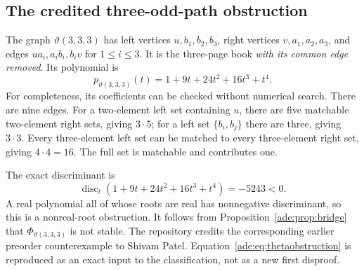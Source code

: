 \documentclass[11pt]{article}
\numberwithin{equation}{section}
\theoremstyle{definition}
\newcommand{\disc}{\operatorname{disc}}
\begin{document}
\subsection{The credited three-odd-path obstruction}

The graph $\vartheta(3,3,3)$ has left vertices $u,b_1,b_2,b_3$, right
vertices $v,a_1,a_2,a_3$, and edges $ua_i,a_ib_i,b_iv$ for $1\le i\le3$.
It is the three-page book \emph{with its common edge removed}.
Its polynomial is
\begin{equation}
 p_{\vartheta(3,3,3)}(t)=1+9t+24t^2+16t^3+t^4.
 \label{ade:eq:thetaobstruction}
\end{equation}
For completeness, its coefficients can be checked without numerical
search.  There are nine edges.  For a two-element left set containing
$u$, there are five matchable two-element right sets, giving $3\cdot5$;
for a left set $\{b_i,b_j\}$ there are three, giving $3\cdot3$.
Every three-element left set can be matched to every three-element right
set, giving $4\cdot4=16$.  The full set is matchable and contributes one.

The exact discriminant is
\begin{equation}
 \disc_t(1+9t+24t^2+16t^3+t^4)=-5243<0.
 \label{ade:eq:thetadisc}
\end{equation}
A real polynomial all of whose roots are real has nonnegative
discriminant, so this is a nonreal-root obstruction.  It follows from
Proposition~\ref{ade:prop:bridge} that $\Phi_{\vartheta(3,3,3)}$ is not stable.
The repository credits the corresponding earlier preorder counterexample
to Shivam Patel.  Equation~\eqref{ade:eq:thetaobstruction} is reproduced as
an exact input to the classification, not as a new first disproof.
\end{document}
